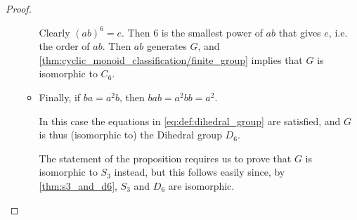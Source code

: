 \begin{proof}
\begin{itemize}
\begin{itemize}
      Clearly \( (ab)^6 = e \). Then \( 6 \) is the smallest power of \( ab \) that gives \( e \), i.e. the order of \( ab \). Then \( ab \) generates \( G \), and \cref{thm:cyclic_monoid_classification/finite_group} implies that \( G \) is isomorphic to \( C_6 \).

      \item Finally, if \( ba = a^2 b \), then \( bab = a^2 bb = a^2 \).

      In this case the equations in \eqref{eq:def:dihedral_group} are satisfied, and \( G \) is thus (isomorphic to) the Dihedral group \( D_6 \).

      The statement of the proposition requires us to prove that \( G \) is isomorphic to \( S_3 \) instead, but this follows easily since, by \cref{thm:s3_and_d6}, \( S_3 \) and \( D_6 \) are isomorphic.
    \end{itemize}
  \end{itemize}
\end{proof}
